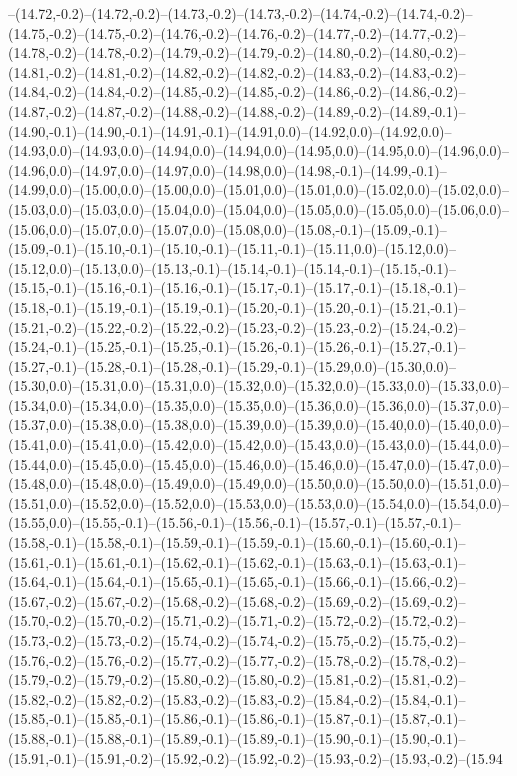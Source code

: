 --(14.72,-0.2)--(14.72,-0.2)--(14.73,-0.2)--(14.73,-0.2)--(14.74,-0.2)--(14.74,-0.2)--(14.75,-0.2)--(14.75,-0.2)--(14.76,-0.2)--(14.76,-0.2)--(14.77,-0.2)--(14.77,-0.2)--(14.78,-0.2)--(14.78,-0.2)--(14.79,-0.2)--(14.79,-0.2)--(14.80,-0.2)--(14.80,-0.2)--(14.81,-0.2)--(14.81,-0.2)--(14.82,-0.2)--(14.82,-0.2)--(14.83,-0.2)--(14.83,-0.2)--(14.84,-0.2)--(14.84,-0.2)--(14.85,-0.2)--(14.85,-0.2)--(14.86,-0.2)--(14.86,-0.2)--(14.87,-0.2)--(14.87,-0.2)--(14.88,-0.2)--(14.88,-0.2)--(14.89,-0.2)--(14.89,-0.1)--(14.90,-0.1)--(14.90,-0.1)--(14.91,-0.1)--(14.91,0.0)--(14.92,0.0)--(14.92,0.0)--(14.93,0.0)--(14.93,0.0)--(14.94,0.0)--(14.94,0.0)--(14.95,0.0)--(14.95,0.0)--(14.96,0.0)--(14.96,0.0)--(14.97,0.0)--(14.97,0.0)--(14.98,0.0)--(14.98,-0.1)--(14.99,-0.1)--(14.99,0.0)--(15.00,0.0)--(15.00,0.0)--(15.01,0.0)--(15.01,0.0)--(15.02,0.0)--(15.02,0.0)--(15.03,0.0)--(15.03,0.0)--(15.04,0.0)--(15.04,0.0)--(15.05,0.0)--(15.05,0.0)--(15.06,0.0)--(15.06,0.0)--(15.07,0.0)--(15.07,0.0)--(15.08,0.0)--(15.08,-0.1)--(15.09,-0.1)--(15.09,-0.1)--(15.10,-0.1)--(15.10,-0.1)--(15.11,-0.1)--(15.11,0.0)--(15.12,0.0)--(15.12,0.0)--(15.13,0.0)--(15.13,-0.1)--(15.14,-0.1)--(15.14,-0.1)--(15.15,-0.1)--(15.15,-0.1)--(15.16,-0.1)--(15.16,-0.1)--(15.17,-0.1)--(15.17,-0.1)--(15.18,-0.1)--(15.18,-0.1)--(15.19,-0.1)--(15.19,-0.1)--(15.20,-0.1)--(15.20,-0.1)--(15.21,-0.1)--(15.21,-0.2)--(15.22,-0.2)--(15.22,-0.2)--(15.23,-0.2)--(15.23,-0.2)--(15.24,-0.2)--(15.24,-0.1)--(15.25,-0.1)--(15.25,-0.1)--(15.26,-0.1)--(15.26,-0.1)--(15.27,-0.1)--(15.27,-0.1)--(15.28,-0.1)--(15.28,-0.1)--(15.29,-0.1)--(15.29,0.0)--(15.30,0.0)--(15.30,0.0)--(15.31,0.0)--(15.31,0.0)--(15.32,0.0)--(15.32,0.0)--(15.33,0.0)--(15.33,0.0)--(15.34,0.0)--(15.34,0.0)--(15.35,0.0)--(15.35,0.0)--(15.36,0.0)--(15.36,0.0)--(15.37,0.0)--(15.37,0.0)--(15.38,0.0)--(15.38,0.0)--(15.39,0.0)--(15.39,0.0)--(15.40,0.0)--(15.40,0.0)--(15.41,0.0)--(15.41,0.0)--(15.42,0.0)--(15.42,0.0)--(15.43,0.0)--(15.43,0.0)--(15.44,0.0)--(15.44,0.0)--(15.45,0.0)--(15.45,0.0)--(15.46,0.0)--(15.46,0.0)--(15.47,0.0)--(15.47,0.0)--(15.48,0.0)--(15.48,0.0)--(15.49,0.0)--(15.49,0.0)--(15.50,0.0)--(15.50,0.0)--(15.51,0.0)--(15.51,0.0)--(15.52,0.0)--(15.52,0.0)--(15.53,0.0)--(15.53,0.0)--(15.54,0.0)--(15.54,0.0)--(15.55,0.0)--(15.55,-0.1)--(15.56,-0.1)--(15.56,-0.1)--(15.57,-0.1)--(15.57,-0.1)--(15.58,-0.1)--(15.58,-0.1)--(15.59,-0.1)--(15.59,-0.1)--(15.60,-0.1)--(15.60,-0.1)--(15.61,-0.1)--(15.61,-0.1)--(15.62,-0.1)--(15.62,-0.1)--(15.63,-0.1)--(15.63,-0.1)--(15.64,-0.1)--(15.64,-0.1)--(15.65,-0.1)--(15.65,-0.1)--(15.66,-0.1)--(15.66,-0.2)--(15.67,-0.2)--(15.67,-0.2)--(15.68,-0.2)--(15.68,-0.2)--(15.69,-0.2)--(15.69,-0.2)--(15.70,-0.2)--(15.70,-0.2)--(15.71,-0.2)--(15.71,-0.2)--(15.72,-0.2)--(15.72,-0.2)--(15.73,-0.2)--(15.73,-0.2)--(15.74,-0.2)--(15.74,-0.2)--(15.75,-0.2)--(15.75,-0.2)--(15.76,-0.2)--(15.76,-0.2)--(15.77,-0.2)--(15.77,-0.2)--(15.78,-0.2)--(15.78,-0.2)--(15.79,-0.2)--(15.79,-0.2)--(15.80,-0.2)--(15.80,-0.2)--(15.81,-0.2)--(15.81,-0.2)--(15.82,-0.2)--(15.82,-0.2)--(15.83,-0.2)--(15.83,-0.2)--(15.84,-0.2)--(15.84,-0.1)--(15.85,-0.1)--(15.85,-0.1)--(15.86,-0.1)--(15.86,-0.1)--(15.87,-0.1)--(15.87,-0.1)--(15.88,-0.1)--(15.88,-0.1)--(15.89,-0.1)--(15.89,-0.1)--(15.90,-0.1)--(15.90,-0.1)--(15.91,-0.1)--(15.91,-0.2)--(15.92,-0.2)--(15.92,-0.2)--(15.93,-0.2)--(15.93,-0.2)--(15.94